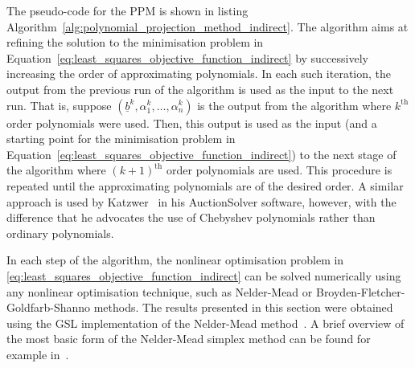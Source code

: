 The pseudo-code for the PPM is shown in listing Algorithm~\ref{alg:polynomial_projection_method_indirect}. The algorithm aims at refining the solution to the minimisation problem in Equation~\eqref{eq:least_squares_objective_function_indirect} by successively increasing the order of approximating polynomials. In each such iteration, the output from the previous run of the algorithm is used as the input to the next run. That is, suppose $(\underline{b}^k, \alpha_1^k, \dotsc, \alpha_n^k)$ is the output from the algorithm where $k^\textrm{th}$ order polynomials were used. Then, this output is used as the input (and a starting point for the minimisation problem in Equation~\eqref{eq:least_squares_objective_function_indirect}) to the next stage of the algorithm where $(k+1)^\textrm{th}$ order polynomials are used. This procedure is repeated until the approximating polynomials are of the desired order. A similar approach is used by Katzwer~\cite{Katzwer2012} in his AuctionSolver software, however, with the difference that he advocates the use of Chebyshev polynomials rather than ordinary polynomials.

In each step of the algorithm, the nonlinear optimisation problem in \eqref{eq:least_squares_objective_function_indirect} can be solved numerically using any nonlinear optimisation technique, such as Nelder-Mead or Broyden-Fletcher-Goldfarb-Shanno methods. The results presented in this section were obtained using the GSL implementation of the Nelder-Mead method~\cite{GSL}. A brief overview of the most basic form of the Nelder-Mead simplex method can be found for example in~\cite{AvrielPenalty2003}.

